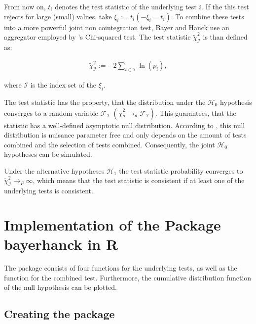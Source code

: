 \documentclass[11pt,a4paper]{article}
\begin{document}
From now on, \(t_i\) denotes the test statistic of the underlying test
\(i\). If the this test rejects for large (small) values, take
\(\xi_i := t_i (-\xi_i = t_i)\). To combine these tests into a more
powerful joint non cointegration test, Bayer and Hanck use an aggregator
employed by \textcite{Fisher1925}'s Chi-squared test. The test statistic
\(\tilde{\chi}_{\mathcal{I}}^2\) is than defined as:

\begin{align}
  \label{eq:bayer-hanck}
  \tilde{\chi}_{\mathcal{I}}^{2} := -2 \sum_{i \in \mathcal{I}} \ln(p_i),
\end{align}

where \(\mathcal{I}\) is the index set of the \(\xi_i\).

The test statistic has the property, that the distribution under the
\(\mathcal{H}_0\) hypothesis converges to a random variable
\(\mathcal{F}_{\mathcal{I}}\)
\(\left(\tilde{\chi}_{\mathcal{I}}^{2} \rightarrow_{d} \mathcal{F}_{\mathcal{I}} \right)\).
This guarantees, that the statistic has a well-defined asymptotic null
distribution. According to \textcite{Bayerhanck2009}, this null
distribution is nuisance parameter free and only depends on the amount
of tests combined and the selection of tests combined. Consequently, the
joint \(\mathcal{H_0}\) hypotheses can be simulated.

Under the alternative hypotheses \(\mathcal{H}_1\) the test statistic
probability converges to
\(\tilde{\chi}_{\mathcal{I}}^{2} \rightarrow_P \infty\), which means
that the test statistic is consistent if at least one of the underlying
tests is consistent.

\hypertarget{implementation-of-the-package-bayerhanck-in-r}{%
\section{\texorpdfstring{Implementation of the Package
\textbf{bayerhanck} in
R}{Implementation of the Package bayerhanck in R}}\label{implementation-of-the-package-bayerhanck-in-r}}

The package consists of four functions for the underlying tests, as well
as the function for the combined test. Furthermore, the cumulative
distribution function of the null hypothesis can be plotted.

\hypertarget{creating-the-package}{%
\subsection{Creating the package}\label{creating-the-package}}
\end{document}
